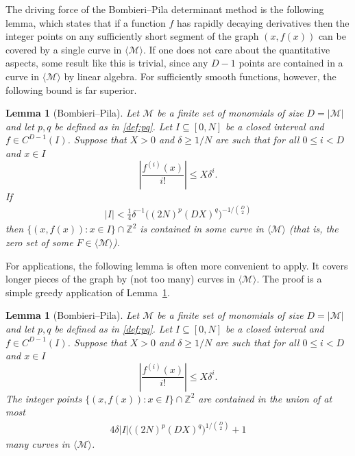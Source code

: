 \documentclass[12pt]{amsart}
\newcommand{\Z}{{\mathbb Z}}
\newcommand{\1}{{\mathbf 1}}
\newtheorem{lemma}[theorem]{Lemma}
\theoremstyle{remark}
\theoremstyle{definition}
\begin{document}
The driving force of the Bombieri--Pila determinant method is the following lemma, which states that if a function $f$ has rapidly decaying derivatives then the integer points on any sufficiently short segment of the graph $(x,f(x))$ can be covered by a single curve in $\langle \mathcal{M}\rangle$. If one does not care about the quantitative aspects, some result like this is trivial, since any $D-1$ points are contained in a curve in $\langle \mathcal{M}\rangle$ by linear algebra. For sufficiently smooth functions, however, the following bound is far superior.
\begin{lemma}[Bombieri--Pila]\label{lem:ptspacing}
Let $\mathcal{M}$ be a finite set of monomials of size $D=\lvert \mathcal{M}\rvert$ and let $p,q$ be defined as in \eqref{def:pq}. Let $I\subseteq [0,N]$ be a closed interval and $f\in C^{D-1}(I)$. Suppose that $X>0$ and $\delta\geq 1/N$ are such that for all $0\leq i<D$ and $x\in I$
\[\left\lvert \frac{f^{(i)}(x)}{i!}\right\rvert\leq X\delta^i.\]
If
\begin{align*}
\lvert I\rvert < \tfrac{1}{4}\delta^{-1}\big((2N)^p(DX)^q\big)^{-1/\binom{D}{2}}
\end{align*}
then $\{(x,f(x)) : x\in I\}\cap \Z^2$ is contained in some curve in $\langle \mathcal{M}\rangle$ (that is, the zero set of some $F\in \langle \mathcal{M}\rangle$). 
\end{lemma}

For applications, the following lemma is often more convenient to apply. It covers longer pieces of the graph by (not too many) curves in $\langle\mathcal{M}\rangle$. The proof is a simple greedy application of Lemma~\ref{lem:ptspacing}.
\begin{lemma}[Bombieri--Pila]\label{lem:bp}
Let $\mathcal{M}$ be a finite set of monomials of size $D=\lvert \mathcal{M}\rvert$ and let $p,q$ be defined as in \eqref{def:pq}. Let $I\subseteq [0,N]$ be a closed interval and $f\in C^{D-1}(I)$. Suppose that $X>0$ and $\delta\geq 1/N$ are such that for all $0\leq i<D$ and $x\in I$
\[\left\lvert \frac{f^{(i)}(x)}{i!}\right\rvert\leq X \delta^i.\]
The integer points  $\{(x,f(x)) : x\in I\}\cap \Z^2$ are contained in the union of at most
\begin{align*}
4\delta\lvert I\rvert\big((2N)^p(DX)^q\big)^{1/\binom{D}{2}}+1
\end{align*}
many curves in $\langle \mathcal{M}\rangle$. 
\end{lemma}
\end{document}
